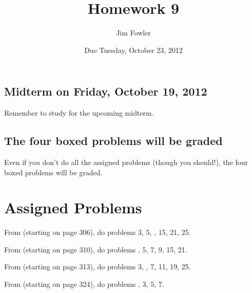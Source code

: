 \documentclass[12pt]{handout}
\title{Homework 9}
\date{Due Tuesday, October 23, 2012}
\author{Jim Fowler}
\begin{document}
\maketitle






\subsection*{Midterm on Friday, October 19, 2012}
Remember to study for the upcoming midterm.




\subsection*{The four boxed problems will be graded}
Even if you don't do all the assigned problems (though you should!), the four boxed problems will be graded.

\section*{Assigned Problems}

From  (starting on page 306),
do problems 3, 5, , 15, 21, 25.
\vspace{1ex}

From  (starting on page 310),
do problems , 5, 7, 9, 15, 21.
\vspace{1ex}

From  (starting on page 313),
do problems 3, , 7, 11, 19, 25.
\vspace{1ex}

From  (starting on page 324),
do problems , 3, 5, 7.
\vspace{1ex}
\end{document}
